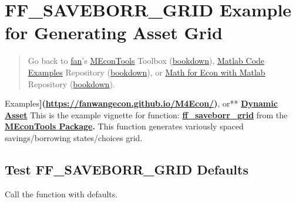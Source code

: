 \documentclass[
]{book}
\begin{document}
\hypertarget{ff_saveborr_grid-example-for-generating-asset-grid}{%
\section{FF\_SAVEBORR\_GRID Example for Generating Asset Grid}\label{ff_saveborr_grid-example-for-generating-asset-grid}}

\begin{quote}
Go back to \href{http://fanwangecon.github.io/}{fan}'s \href{https://fanwangecon.github.io/MEconTools/}{MEconTools} Toolbox (\href{https://fanwangecon.github.io/MEconTools/bookdown}{bookdown}), \href{https://fanwangecon.github.io/M4Econ/}{Matlab Code Examples} Repository (\href{https://fanwangecon.github.io/M4Econ/bookdown}{bookdown}), or \href{https://fanwangecon.github.io/Math4Econ/}{Math for Econ with Matlab} Repository (\href{https://fanwangecon.github.io/Math4Econ/bookdown}{bookdown}).
\end{quote}

Examples\textbf{{]}(\url{https://fanwangecon.github.io/M4Econ/})}, or** \href{https://fanwangecon.github.io/CodeDynaAsset/}{\textbf{Dynamic
Asset}}
This is the example vignette for function:
\href{https://github.com/FanWangEcon/MEconTools/blob/master/MEconTools/generate/ff_saveborr_grid.m}{\textbf{ff\_saveborr\_grid}}
from the \href{https://fanwangecon.github.io/MEconTools/}{\textbf{MEconTools
Package}}\textbf{.} This function
generates variously spaced savings/borrowing states/choices grid.

\hypertarget{test-ff_saveborr_grid-defaults}{%
\subsection{Test FF\_SAVEBORR\_GRID Defaults}\label{test-ff_saveborr_grid-defaults}}

Call the function with defaults.
\end{document}
